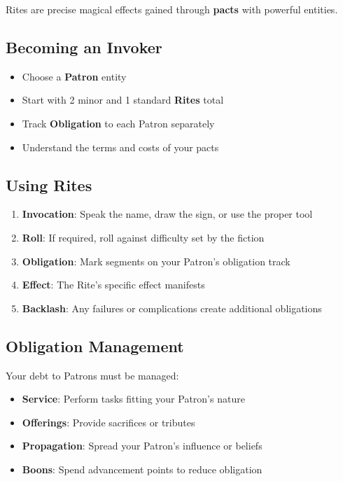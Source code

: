 \begin{multicols}{2}
Rites are precise magical effects gained through \textbf{pacts} with powerful entities.

\subsection*{Becoming an Invoker}
\begin{itemize}
\item Choose a \textbf{Patron} entity
\item Start with 2 minor and 1 standard \textbf{Rites} total
\item Track \textbf{Obligation} to each Patron separately
\item Understand the terms and costs of your pacts
\end{itemize}

\subsection*{Using Rites}
\begin{enumerate}
\item \textbf{Invocation}: Speak the name, draw the sign, or use the proper tool
\item \textbf{Roll}: If required, roll against difficulty set by the fiction
\item \textbf{Obligation}: Mark segments on your Patron's obligation track
\item \textbf{Effect}: The Rite's specific effect manifests
\item \textbf{Backlash}: Any failures or complications create additional obligations
\end{enumerate}

\subsection*{Obligation Management}
Your debt to Patrons must be managed:
\begin{itemize}
\item \textbf{Service}: Perform tasks fitting your Patron's nature
\item \textbf{Offerings}: Provide sacrifices or tributes
\item \textbf{Propagation}: Spread your Patron's influence or beliefs
\item \textbf{Boons}: Spend advancement points to reduce obligation
\end{itemize}


\end{multicols}
